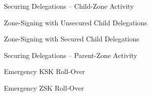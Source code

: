 \documentclass[12pt]{article}
\begin{document}
\clearpage

\begin{figure}[htb]
\begin{center}
\epsfxsize 6.0in
\end{center}
\caption{Securing Delegations -- Child-Zone Activity}
\label{fig:securingdeleg-child}
\end{figure}

\clearpage

\begin{figure}[htb]
\begin{center}
\epsfxsize 6.0in
\end{center}
\caption{Zone-Signing with Unsecured Child Delegations}
\label{fig:zonesign-unsecure}
\end{figure}

\clearpage

\begin{figure}[htb]
\begin{center}
\epsfxsize 6.0in
\end{center}
\caption{Zone-Signing with Secured Child Delegations}
\label{fig:zonesign-secure}
\end{figure}

\clearpage

\begin{figure}[htb]
\begin{center}
\epsfxsize 6.0in
\end{center}
\caption{Securing Delegations -- Parent-Zone Activity}
\label{fig:securingdeleg-parent}
\end{figure}

\clearpage

\begin{figure}[htb]
\begin{center}
\epsfxsize 6.0in
\end{center}
\caption{Emergency KSK Roll-Over}
\label{fig:kskroll-emerg}
\end{figure}

\clearpage

\begin{figure}[htb]
\begin{center}
\epsfxsize 6.0in
\end{center}
\caption{Emergency ZSK Roll-Over}
\label{fig:zskroll-emerg}
\end{figure}
\end{document}
